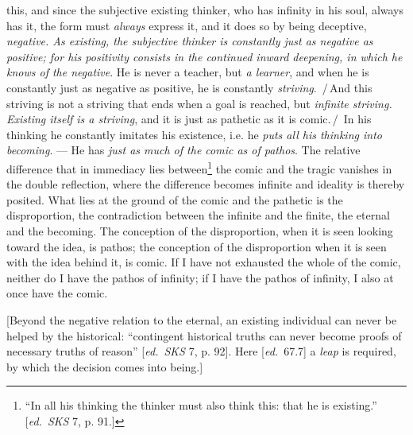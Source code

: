 \documentclass[12pt,a4paper,openany]{book}
\newcommand{\kpage}[1]{\marginnote{\footnotesize\textit{[#1]}}}
\newcommand{\ed}[1]{{\small[\textit{ed.}\ #1]}}
\newcommand{\ins}[1]{\,/\,#1\,/\,}
\newcommand{\lecture}[1]{\par\bigskip\noindent{\large #1}\par\nobreak\medskip}
\begin{document}
this, and since the subjective existing thinker, who has infinity
in his soul, always has it, the form must \emph{always} express it,
and it does so by being deceptive, \emph{negative. As existing, the
subjective thinker is constantly just as negative as positive; for his positivity consists
in the continued inward deepening, in which he knows of the negative}.
He is never a teacher, but \emph{a learner}, and when he is constantly just as
negative as positive, he is constantly \emph{striving}. \ins{And this
striving is not a striving that ends when a goal is reached, but
\emph{infinite striving. Existing itself is a striving}, and it is just as pathetic
as it is comic.} In his thinking he constantly imitates his existence,
i.e. he \emph{puts all his thinking into becoming}. --- He has \emph{just as much of the comic
as of pathos}. The relative difference that in immediacy lies
\kpage{113}between\footnote[42]{``In all his thinking the thinker must also think this: that he is existing.''
\ed{\emph{SKS} 7, p. 91.}}
the comic and the tragic vanishes in the double reflection,
where the difference becomes infinite and ideality is thereby
posited. What lies at the ground of the comic and the pathetic is
the disproportion, the contradiction between the infinite and the finite,
the eternal and the becoming. The conception of the disproportion, when it
is seen looking toward the idea, is pathos; the conception of the disproportion when it
is seen with the idea behind it, is comic. If I have not exhausted the whole of the
comic, neither do I have the pathos of infinity; if I have the pathos of infinity,
I also at once have the comic.

[Beyond the negative relation to the eternal, an existing individual can never
be helped by the historical: ``contingent historical truths
can never become proofs of necessary truths of reason''
\ed{\emph{SKS} 7, p. 92}. Here \ed{67.7} a \emph{leap} is required, by which the decision
comes into being.]

\lecture{Lecture 23}
\end{document}
